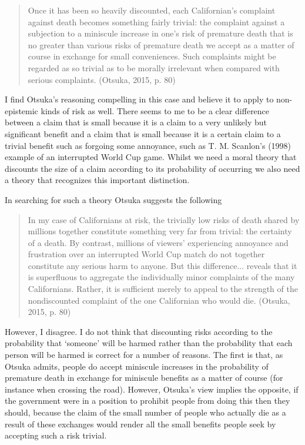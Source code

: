 \documentclass[man,11pt,a4paper]{apa7}
\begin{document}
\begin{quote}
Once it has been so heavily discounted, each Californian's complaint against death becomes something fairly trivial: the complaint against a subjection to a miniscule increase in one's risk of premature death that is no greater than various risks of premature death we accept as a matter of course in exchange for small conveniences. Such complaints might be regarded as so trivial as to be morally irrelevant when compared with serious complaints. (Otsuka, 2015, p. 80)
\end{quote}

I find Otsuka's reasoning compelling in this case and believe it to apply to non-epistemic kinds of risk as well. There seems to me to be a clear difference between a claim that is small because it is a claim to a very unlikely but significant benefit and a claim that is small because it is a certain claim to a trivial benefit such as forgoing some annoyance, such as T. M. Scanlon's (1998) example of an interrupted World Cup game. Whilst we need a moral theory that discounts the size of a claim according to its probability of occurring we also need a theory that recognizes this important distinction.

In searching for such a theory Otsuka suggests the following

\begin{quote}
In my case of Californians at risk, the trivially low risks of death shared by millions together constitute something very far from trivial: the certainty of a death. By contrast, millions of viewers' experiencing annoyance and frustration over an interrupted World Cup match do not together constitute any serious harm to anyone. But this difference... reveals that it is superfluous to aggregate the individually minor complaints of the many Californians. Rather, it is sufficient merely to appeal to the strength of the nondiscounted complaint of the one Californian who would die. (Otsuka, 2015, p. 80)
\end{quote}

However, I disagree. I do not think that discounting risks according to the probability that `someone' will be harmed rather than the probability that each person will be harmed is correct for a number of reasons. The first is that, as Otsuka admits, people do accept miniscule increases in the probability of premature death in exchange for miniscule benefits as a matter of course (for instance when crossing the road). However, Otsuka's view implies the opposite, if the government were in a position to prohibit people from doing this then they should, because the claim of the small number of people who actually die as a result of these exchanges would render all the small benefits people seek by accepting such a risk trivial.
\end{document}
